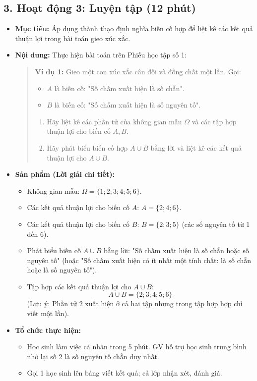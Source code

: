 \documentclass[12pt, a4paper]{article}
\begin{document}
\subsection*{3. Hoạt động 3: Luyện tập (12 phút)}

\begin{itemize}[leftmargin=1.2cm]
    \item[a)] \textbf{Mục tiêu:} Áp dụng thành thạo định nghĩa biến cố hợp để liệt kê các kết quả thuận lợi trong bài toán gieo xúc xắc.
    \item[b)] \textbf{Nội dung:} Thực hiện bài toán trên Phiếu học tập số 1:
    \begin{quote}
        \textbf{Ví dụ 1:} Gieo một con xúc xắc cân đối và đồng chất một lần. Gọi:
        \begin{itemize}
            \item $A$ là biến cố: "Số chấm xuất hiện là số chẵn".
            \item $B$ là biến cố: "Số chấm xuất hiện là số nguyên tố".
        \end{itemize}
        \begin{enumerate}
            \item Hãy liệt kê các phần tử của không gian mẫu $\Omega$ và các tập hợp thuận lợi cho biến cố $A, B$.
            \item Hãy phát biểu biến cố hợp $A \cup B$ bằng lời và liệt kê các kết quả thuận lợi cho $A \cup B$.
        \end{enumerate}
    \end{quote}

    \item[c)] \textbf{Sản phẩm (Lời giải chi tiết):}
    \begin{itemize}[leftmargin=0.6cm]
        \item Không gian mẫu: $\Omega = \{1; 2; 3; 4; 5; 6\}$.
        \item Các kết quả thuận lợi cho biến cố $A$: $A = \{2; 4; 6\}$.
        \item Các kết quả thuận lợi cho biến cố $B$: $B = \{2; 3; 5\}$ (các số nguyên tố từ 1 đến 6).
        \item Phát biểu biến cố $A \cup B$ bằng lời: "Số chấm xuất hiện là số chẵn hoặc số nguyên tố" (hoặc "Số chấm xuất hiện có ít nhất một tính chất: là số chẵn hoặc là số nguyên tố").
        \item Tập hợp các kết quả thuận lợi cho $A \cup B$:
        $$A \cup B = \{2; 3; 4; 5; 6\}$$
        (Lưu ý: Phần tử $2$ xuất hiện ở cả hai tập nhưng trong tập hợp hợp chỉ viết một lần).
    \end{itemize}

    \item[d)] \textbf{Tổ chức thực hiện:}
    \begin{itemize}[leftmargin=0.6cm]
        \item Học sinh làm việc cá nhân trong 5 phút. GV hỗ trợ học sinh trung bình nhớ lại số 2 là số nguyên tố chẵn duy nhất.
        \item Gọi 1 học sinh lên bảng viết kết quả; cả lớp nhận xét, đánh giá.
    \end{itemize}
\end{itemize}
\end{document}
